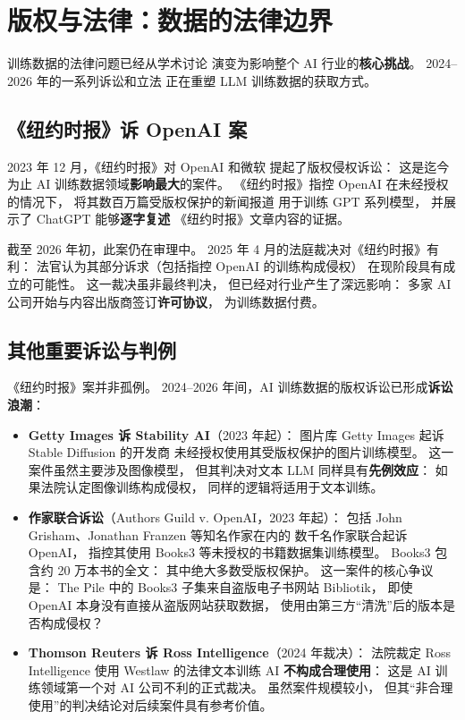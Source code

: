 \section{版权与法律：数据的法律边界}

训练数据的法律问题已经从学术讨论
演变为影响整个 AI 行业的\textbf{核心挑战}。
2024--2026 年的一系列诉讼和立法
正在重塑 LLM 训练数据的获取方式。

\subsection{《纽约时报》诉 OpenAI 案}

2023 年 12 月，《纽约时报》对 OpenAI 和微软
提起了版权侵权诉讼：
这是迄今为止 AI 训练数据领域\textbf{影响最大}的案件。
《纽约时报》指控 OpenAI 在未经授权的情况下，
将其数百万篇受版权保护的新闻报道
用于训练 GPT 系列模型，
并展示了 ChatGPT 能够\textbf{逐字复述}
《纽约时报》文章内容的证据。

截至 2026 年初，此案仍在审理中。
2025 年 4 月的法庭裁决对《纽约时报》有利：
法官认为其部分诉求（包括指控 OpenAI 的训练构成侵权）
在现阶段具有成立的可能性。
这一裁决虽非最终判决，
但已经对行业产生了深远影响：
多家 AI 公司开始与内容出版商签订\textbf{许可协议}，
为训练数据付费。

\subsection{其他重要诉讼与判例}

《纽约时报》案并非孤例。
2024--2026 年间，AI 训练数据的版权诉讼已形成\textbf{诉讼浪潮}：

\begin{itemize}[noitemsep]
  \item \textbf{Getty Images 诉 Stability AI}（2023 年起）：
        图片库 Getty Images 起诉 Stable Diffusion 的开发商
        未经授权使用其受版权保护的图片训练模型。
        这一案件虽然主要涉及图像模型，
        但其判决对文本 LLM 同样具有\textbf{先例效应}：
        如果法院认定图像训练构成侵权，
        同样的逻辑将适用于文本训练。
  \item \textbf{作家联合诉讼}（Authors Guild v. OpenAI，2023 年起）：
        包括 John Grisham、Jonathan Franzen 等知名作家在内的
        数千名作家联合起诉 OpenAI，
        指控其使用 Books3 等未授权的书籍数据集训练模型。
        Books3 包含约 20 万本书的全文：
        其中绝大多数受版权保护。
        这一案件的核心争议是：
        The Pile 中的 Books3 子集来自盗版电子书网站 Bibliotik，
        即使 OpenAI 本身没有直接从盗版网站获取数据，
        使用由第三方“清洗”后的版本是否构成侵权？
  \item \textbf{Thomson Reuters 诉 Ross Intelligence}（2024 年裁决）：
        法院裁定 Ross Intelligence 使用 Westlaw 的法律文本训练 AI
        \textbf{不构成合理使用}：
        这是 AI 训练领域第一个对 AI 公司不利的正式裁决。
        虽然案件规模较小，
        但其“非合理使用”的判决结论对后续案件具有参考价值。
\end{itemize}

